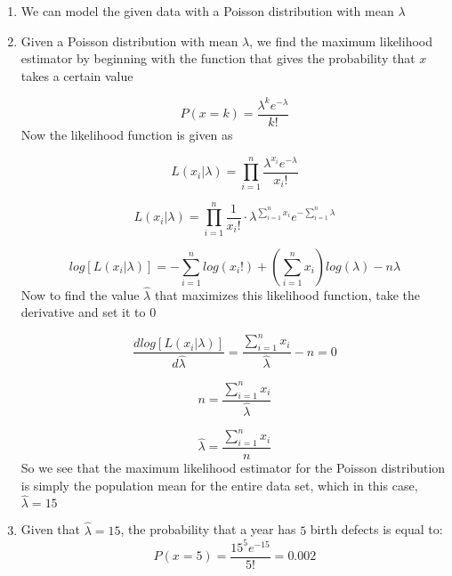 \documentclass[12pt]{article}
\begin{document}
\begin{enumerate}
\item We can model the given data with a Poisson distribution with mean $\lambda$

\item Given a Poisson distribution with mean $\lambda$, we find the maximum likelihood estimator by beginning with the function that gives the probability that $x$ takes a certain value

\begin{equation*}
P(x = k) = \dfrac{\lambda^{k}e^{-\lambda}}{k!}
\end{equation*}
Now the likelihood function is given as

\begin{equation*}
L(x_{i} | \lambda) = \prod_{i=1}^{n}\dfrac{\lambda^{x_{i}}e^{-\lambda}}{x_{i}!}
\end{equation*}

\begin{equation*}
L(x_{i} | \lambda) = \prod_{i=1}^{n}\dfrac{1}{x_{i}!} \cdot \lambda^{\sum_{i = 1}^{n}x_{i}}e^{-\sum_{i=1}^{n}\lambda}
\end{equation*}

\begin{equation*}
log[L(x_{i} | \lambda)] = -\sum_{i = 1}^{n}log(x_{i}!) + (\sum_{i = 1}^{n}x_{i})log(\lambda) - n\lambda
\end{equation*}
Now to find the value $\hat{\lambda}$ that maximizes this likelihood function, take the derivative and set it to 0

\begin{equation*}
\dfrac{dlog[L(x_{i} | \lambda)]}{d\hat{\lambda}} = \dfrac{\sum_{i = 1}^{n}x_{i}}{\hat{\lambda}} - n = 0
\end{equation*}

\begin{equation*}
n = \dfrac{\sum_{i = 1}^{n}x_{i}}{\hat{\lambda}}
\end{equation*}

\begin{equation*}
\hat{\lambda} = \dfrac{\sum_{i = 1}^{n}x_{i}}{n}
\end{equation*}
So we see that the maximum likelihood estimator for the Poisson distribution is simply the population mean for the entire data set, which in this case, $\hat{\lambda} = 15$

\item Given that $\hat{\lambda} = 15$, the probability that a year has $5$ birth defects is equal to:
\begin{equation*}
P(x = 5) = \dfrac{15^{5}e^{-15}}{5!} = 0.002
\end{equation*}

\end{enumerate}
\end{document}
